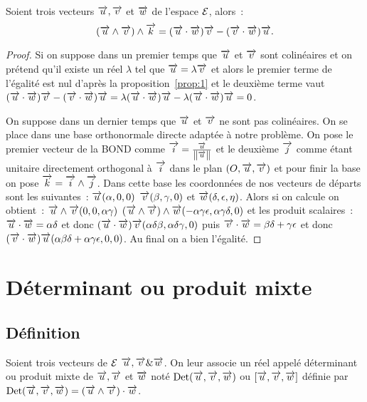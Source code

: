 \begin{prop}
  Soient trois vecteurs \(\vu, \vv\) et \(\vw\) de l'espace \(\E\), alors~:
  \begin{equation}
    (\vu\wedge\vv)\wedge\vk = (\vu\cdot\vw)\vv - (\vv\cdot\vw)\vu.
  \end{equation}
\end{prop}

\begin{proof}
  Si on suppose dans un premier temps que \(\vu\) et \(\vv\) sont colinéaires
  et on prétend qu'il existe un réel \(\lambda\) tel que \(\vu = \lambda\vv\)
  et alors le premier terme de l'égalité est nul d'après la
  proposition~\ref{prop:1} et le deuxième terme vaut \((\vu\cdot\vw)\vv -
  (\vv\cdot\vw)\vu = \lambda(\vu\cdot\vw)\vu - \lambda(\vu\cdot\vw)\vu = 0\).

  On suppose dans un dernier temps que \(\vu\) et \(\vv\) ne sont pas
  colinéaires. On se place dans une base orthonormale directe adaptée à notre
  problème. On pose le premier vecteur de la BOND comme \(\vi =
  \frac{\vu}{\norme{\vu}}\) et le deuxième \(\vj\) comme étant unitaire
  directement orthogonal à \(\vi\) dans le plan \((O, \vu, \vv)\) et pour
  finir la base on pose \(\vk = \vi\wedge\vj\). Dans cette base les
  coordonnées de nos vecteurs de départs sont les suivantes~: \(\vu(\alpha, 0,
  0)\) \(\vv(\beta, \gamma, 0)\) et \(\vw(\delta, \epsilon, \eta)\). Alors si
  on calcule on obtient~: \(\vu\wedge\vv(0, 0, \alpha\gamma)\)
  \((\vu\wedge\vv)\wedge\vw(-\alpha\gamma\epsilon, \alpha\gamma\delta, 0)\) et
  les produit scalaires~: \(\vu\cdot\vw = \alpha\delta\) et donc
  \((\vu\cdot\vw)\vv(\alpha\delta\beta, \alpha\delta\gamma, 0)\) puis
  \(\vv\cdot\vw = \beta\delta + \gamma\epsilon\) et donc
  \((\vv\cdot\vw)\vu(\alpha\beta\delta + \alpha\gamma\epsilon, 0, 0)\). Au
  final on a bien l'égalité.
\end{proof}

\section{Déterminant ou produit mixte}
\subsection{Définition}

\begin{defdef}
  Soient trois vecteurs de \(\E\) \(\vu, \vv \& \vw\). On leur associe un réel
  appelé déterminant ou produit mixte de \(\vu, \vv\) et \(\vw\) noté
  \(\Det(\vu, \vv, \vw)\) ou \([\vu, \vv, \vw]\) définie par \(\Det(\vu, \vv,
  \vw) = (\vu\wedge\vv)\cdot\vw\).
\end{defdef}

